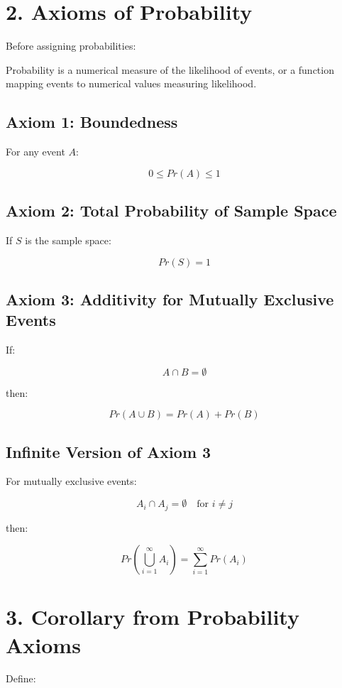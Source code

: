 \documentclass[12pt]{article}
\begin{document}
\section*{2. Axioms of Probability}

Before assigning probabilities:

Probability is a numerical measure of the likelihood of events, or a function mapping events to numerical values measuring likelihood.

\subsection*{Axiom 1: Boundedness}

For any event $A$:

\[
0 \le Pr(A) \le 1
\]

\subsection*{Axiom 2: Total Probability of Sample Space}

If $S$ is the sample space:

\[
Pr(S) = 1
\]

\subsection*{Axiom 3: Additivity for Mutually Exclusive Events}

If:

\[
A \cap B = \emptyset
\]

then:

\[
Pr(A \cup B) = Pr(A) + Pr(B)
\]

\subsection*{Infinite Version of Axiom 3}

For mutually exclusive events:

\[
A_i \cap A_j = \emptyset \quad \text{for } i \ne j
\]

then:

\[
Pr\left(\bigcup_{i=1}^{\infty} A_i\right) = \sum_{i=1}^{\infty} Pr(A_i)
\]

\section*{3. Corollary from Probability Axioms}

Define:
\end{document}
